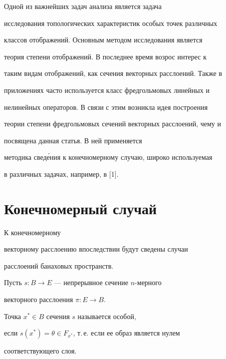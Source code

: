 \label{begin} 


 


 


Одной из важнейших задач анализа является задача 


исследования топологических характеристик особых точек различных 


классов отображений. Основным методом исследования является 


теория степени отображений. В последнее время возрос интерес к 


таким видам отображений, как сечения векторных расслоений. Также в 


приложениях часто используется класс фредгольмовых линейных и 


нелинейных операторов. В связи с этим возникла идея построения 


теории степени фредгольмовых сечений векторных расслоений, чему и 


посвящена данная статья. В ней применяется 


методика свед\'ения к конечномерному случаю, широко используемая 


в различных задачах, например, в [1]. 


 


 


\section{Конечномерный случай} 


 


 


К конечномерному 


векторному расслоению впоследствии будут сведены случаи 


расслоений банаховых пространств. 


 


Пусть $s:B\to E$ --- непрерывное сечение $n$-мерного 


векторного расслоения $\pi:E\to B$. 


 


\begin{defn} 


Точка $x^*\in B$ сечения $s$ называется особой, 


если $s(x^*)=\theta\in F_{x^*}$, т.\,е. если ее образ является нулем 


соответствующего слоя. 


\end{defn} 


